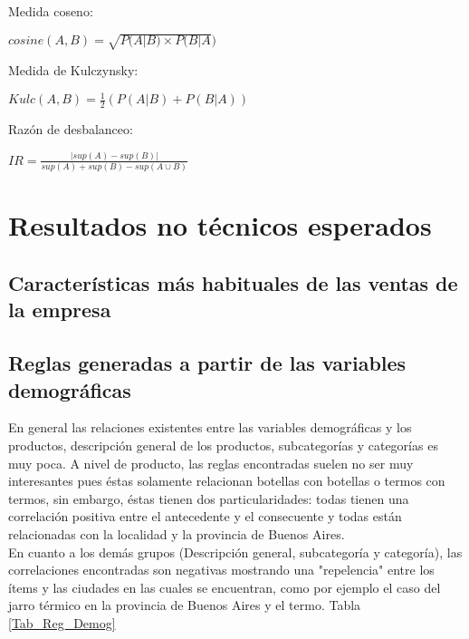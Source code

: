\documentclass[]{article}
\begin{document}
Medida coseno:

\begin{center}
	$cosine(A,B) = \sqrt{P(A|B) \times P(B|A})$
\end{center}
	
Medida de Kulczynsky:
	
	\begin{center}
	$Kulc(A,B)= \frac{1}{2}\left(P(A|B) + P(B|A)\right)$	
\end{center}
		
Razón de desbalanceo:
		
\begin{center}
	$IR = \frac{|sup(A)- sup(B)|}{sup(A)+ sup(B)-sup(A \cup B)}$	
\end{center}

\section{Resultados no técnicos esperados}


\subsection{Características más habituales de las ventas de la empresa}


\subsection{Reglas generadas a partir de las variables demográficas}
En general las relaciones existentes entre las variables demográficas y los productos, descripción general de los productos, subcategorías y categorías es muy poca. A nivel de producto, las reglas encontradas suelen no ser muy interesantes pues éstas solamente relacionan botellas con botellas o termos con termos, sin embargo, éstas tienen dos particularidades: todas tienen una correlación positiva entre el antecedente y el consecuente y todas están relacionadas con la localidad y la provincia de Buenos Aires.\\

 En cuanto a los demás grupos (Descripción general, subcategoría y categoría), las correlaciones encontradas son negativas mostrando una "repelencia" entre los ítems y las ciudades en las cuales se encuentran, como por ejemplo el caso del jarro térmico en la provincia de Buenos Aires y el termo. Tabla  \ref{Tab_Reg_Demog}
 
\end{document}
